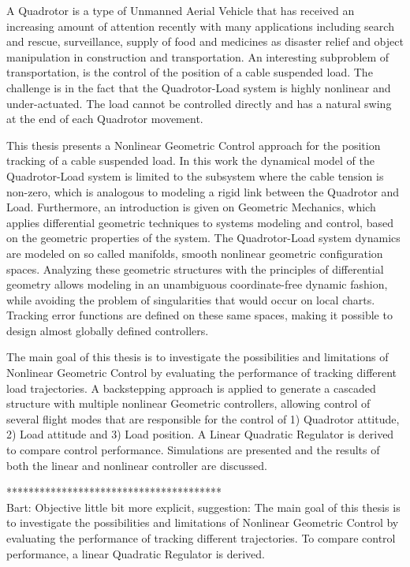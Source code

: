 
A Quadrotor is a type of Unmanned Aerial Vehicle that has received an increasing amount of attention recently with many applications including search and rescue, surveillance, supply of food and medicines as disaster relief and object manipulation in construction and transportation.
An interesting subproblem of transportation, is the control of the position of a cable suspended load. The challenge is in the fact that the Quadrotor-Load system is highly nonlinear and under-actuated. The load cannot be controlled directly and has a natural swing at the end of each Quadrotor movement. 

This thesis presents a Nonlinear Geometric Control approach for the position tracking of a cable suspended load. In this work the dynamical model of the Quadrotor-Load system is limited to the subsystem where the cable tension is non-zero, which is analogous to modeling a rigid link between the Quadrotor and Load.
Furthermore, an introduction is given on Geometric Mechanics, which applies differential geometric techniques to systems modeling and control, based on the geometric properties of the system. The Quadrotor-Load system dynamics are modeled on so called manifolds, smooth nonlinear geometric configuration spaces. 
Analyzing these geometric structures with the principles of differential geometry allows modeling in an unambiguous coordinate-free dynamic fashion, while avoiding the problem of singularities that would occur on local charts. Tracking error functions are defined on these same spaces, making it possible to design almost globally defined controllers.

The main goal of this thesis is to investigate the possibilities and limitations of Nonlinear Geometric Control by evaluating the performance of tracking different load trajectories. 
A backstepping approach is applied to generate a cascaded structure with multiple nonlinear Geometric controllers, allowing control of several flight modes that are responsible for the control of 1) Quadrotor attitude, 2) Load attitude and 3) Load position. 
A Linear Quadratic Regulator is derived to compare control performance. Simulations are presented and the results of both the linear and nonlinear controller are discussed. 

%
***************************************\\
Bart: Objective little bit more explicit, suggestion: The main goal of this thesis is to investigate the possibilities and limitations of Nonlinear Geometric Control by evaluating the performance of tracking different trajectories. To compare control performance, a linear Quadratic Regulator is derived. 

